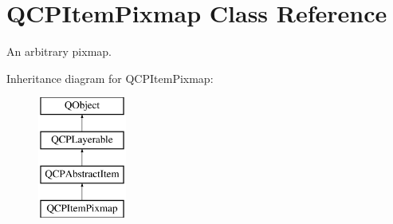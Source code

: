 \hypertarget{classQCPItemPixmap}{\section{Q\-C\-P\-Item\-Pixmap Class Reference}
\label{classQCPItemPixmap}
}


An arbitrary pixmap.  


Inheritance diagram for Q\-C\-P\-Item\-Pixmap\-:\begin{figure}[H]
\begin{center}
\leavevmode
\includegraphics[height=4.000000cm]{classQCPItemPixmap}
\end{center}
\end{figure}
